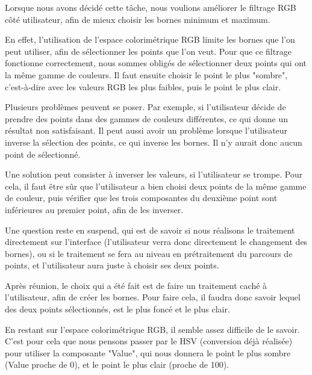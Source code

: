 \documentclass[12pt,titlepage,french]{article}
\begin{document}
Lorsque nous avons décidé cette tâche, nous voulions améliorer le filtrage RGB côté utilisateur, afin de mieux choisir les bornes minimum et maximum. \newline

En effet, l'utilisation de l'espace colorimétrique RGB limite les bornes que l'on peut utiliser, afin de sélectionner les points que l'on veut. Pour que ce filtrage fonctionne correctement, nous sommes obligés de sélectionner deux points qui ont la même gamme de couleurs. Il faut ensuite choisir le point le plus "sombre", c'est-à-dire avec les valeurs RGB les plus faibles, puis le point le plus clair. \newline

Plusieurs problèmes peuvent se poser. Par exemple, si l'utilisateur décide de prendre des points dans des gammes de couleurs différentes, ce qui donne un résultat non satisfaisant. Il peut aussi avoir un problème lorsque l'utilisateur inverse la sélection des points, ce qui inverse les bornes. Il n'y aurait donc aucun point de sélectionné. \newline

Une solution peut consister à inverser les valeurs, si l'utilisateur se trompe. Pour cela, il faut être sûr que l'utilisateur a bien choisi deux points de la même gamme de couleur, puis vérifier que les trois composantes du deuxième point sont inférieures au premier point, afin de les inverser. \newline

Une question reste en suspend, qui est de savoir si nous réalisons le traitement directement sur l'interface (l'utilisateur verra donc directement le changement des bornes), ou si le traitement se fera au niveau en prétraitement du parcours de points, et l'utilisateur aura juste à choisir ses deux points. \newline

Après réunion, le choix qui a été fait est de faire un traitement caché à l'utilisateur, afin de créer les bornes. Pour faire cela, il faudra donc savoir lequel des deux points sélectionnés, est le plus foncé et le plus clair. \newline

En restant sur l'espace colorimétrique RGB, il semble assez difficile de le savoir. C'est pour cela que nous pensons passer par le HSV (conversion déjà réalisée) pour utiliser la composante "Value", qui nous donnera le point le plus sombre (Value proche de 0), et le point le plus clair (proche de 100). \newline
\end{document}
